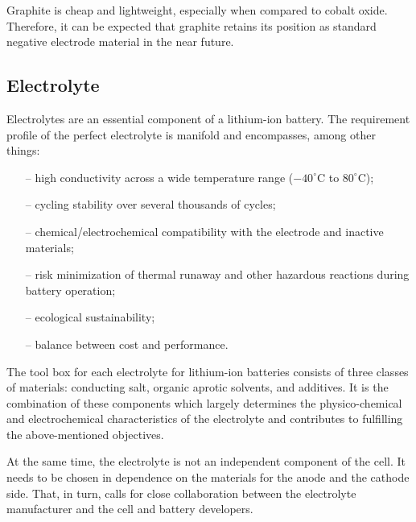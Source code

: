 Graphite is cheap and lightweight, especially when compared to cobalt oxide. Therefore, it can be expected that graphite retains its position as standard negative electrode material in the near future.

\subsection{Electrolyte}
\label{sec:electrolyte}
Electrolytes are an essential component of a lithium-ion battery. The requirement profile of the perfect electrolyte is manifold and encompasses, among other things:
\begin{itemize}
    \item[--] high conductivity across a wide temperature range ($-40^\circ$C to $80^\circ$C);
    \item[--] cycling stability over several thousands of cycles;
    \item[--] chemical/electrochemical compatibility with the electrode and inactive materials;
    \item[--] risk minimization of thermal runaway and other hazardous reactions during battery operation;
    \item[--] ecological sustainability;
    \item[--] balance between cost and performance.
\end{itemize}
The tool box for each electrolyte for lithium-ion batteries consists of three classes of materials: conducting salt, organic aprotic solvents, and additives. It is the combination of these components which largely determines the physico-chemical and electrochemical characteristics of the electrolyte and contributes to fulfilling the above-mentioned objectives. 

At the same time, the electrolyte is not an independent component of the cell. It needs to be chosen in dependence on the materials for the anode and the cathode side. That, in turn, calls for close collaboration between the electrolyte manufacturer and the cell and battery developers.

\cite{xu2004nonaqueous,aurbach1995study,song1999review,korthauer2018lithium}

